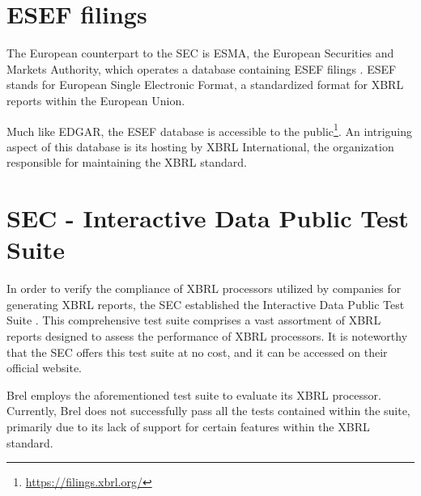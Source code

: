 \section{ESEF filings}
The European counterpart to the SEC is ESMA, 
the European Securities and Markets Authority, 
which operates a database containing ESEF filings \cite{esma_database}. 
ESEF stands for European Single Electronic Format, 
a standardized format for XBRL reports within the European Union.

Much like EDGAR, the ESEF database is accessible to the public\footnote{\url{https://filings.xbrl.org/}}. 
An intriguing aspect of this database is its hosting by XBRL International, the organization responsible for maintaining the XBRL standard.

\section{SEC - Interactive Data Public Test Suite}
\label{sec:idpts}
In order to verify the compliance of XBRL processors utilized by companies for generating XBRL reports, 
the SEC established the Interactive Data Public Test Suite \cite{sec_idpts}. 
This comprehensive test suite comprises a vast assortment of XBRL reports designed to assess the performance of XBRL processors.
It is noteworthy that the SEC offers this test suite at no cost, and it can be accessed on their official website.

Brel employs the aforementioned test suite to evaluate its XBRL processor. 
Currently, Brel does not successfully pass all the tests contained within the suite, 
primarily due to its lack of support for certain features within the XBRL standard.

